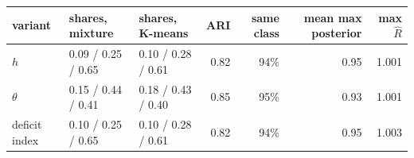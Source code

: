 \begin{tabular}{lllrrrr}
\toprule
variant & shares, mixture & shares, K-means & ARI & same class & mean max posterior & max $\hat R$ \\
\midrule
$h$ & 0.09 / 0.25 / 0.65 & 0.10 / 0.28 / 0.61 & 0.82 & 94\% & 0.95 & 1.001 \\
$\theta$ & 0.15 / 0.44 / 0.41 & 0.18 / 0.43 / 0.40 & 0.85 & 95\% & 0.93 & 1.001 \\
deficit index & 0.10 / 0.25 / 0.65 & 0.10 / 0.28 / 0.61 & 0.82 & 94\% & 0.95 & 1.003 \\
\bottomrule
\end{tabular}

